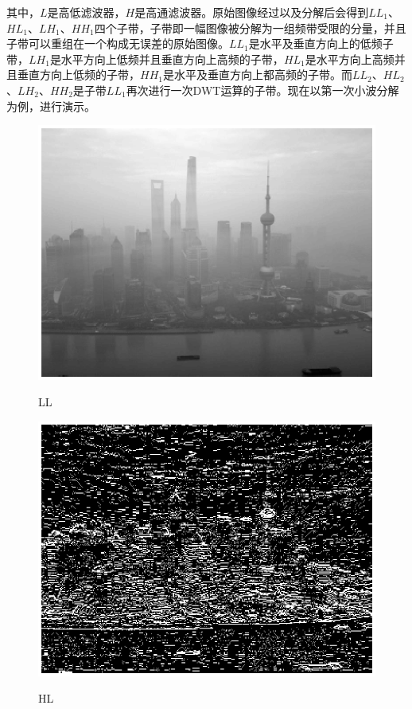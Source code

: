 \documentclass[12pt]{book}
\begin{document}
其中，$L$是高低滤波器，$H$是高通滤波器。原始图像经过以及分解后会得到$LL_1$、$HL_1$、$LH_1$、$HH_1$四个子带，子带即一幅图像被分解为一组频带受限的分量，并且子带可以重组在一个构成无误差的原始图像。$LL_1$是水平及垂直方向上的低频子带，$LH_1$是水平方向上低频并且垂直方向上高频的子带，$HL_1$是水平方向上高频并且垂直方向上低频的子带，$HH_1$是水平及垂直方向上都高频的子带。而$LL_2$、$HL_2$、$LH_2$、$HH_2$是子带$LL_1$再次进行一次DWT运算的子带。现在以第一次小波分解为例，进行演示。
				\begin{figure}[ht]
					\begin{minipage}{0.48\linewidth}
						\centerline{\includegraphics[width=1\textwidth]{./figures/LL.eps}}
						\centerline{LL}
					\end{minipage}
					\qquad
					\begin{minipage}{0.48\linewidth}
						\centerline{\includegraphics[width=1\textwidth]{./figures/HL.eps}}
						\centerline{HL}
					\end{minipage}


\end{figure}
\end{document}
